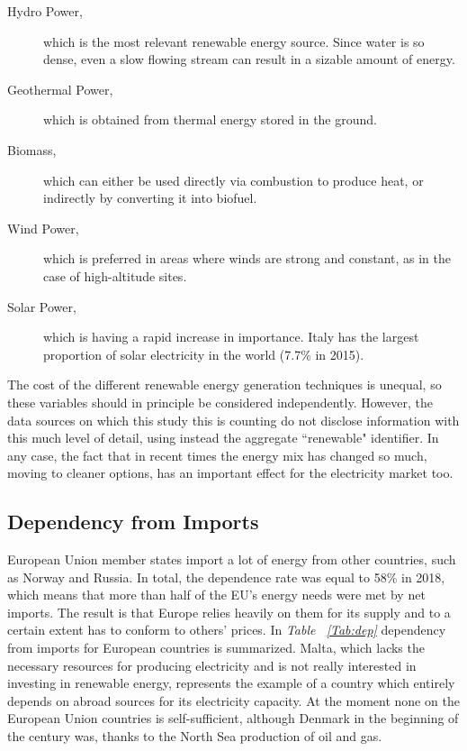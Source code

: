 \documentclass[a4paper,12pt]{book}
\begin{document}
\begin{description}
\item[Hydro Power,] which is the most relevant renewable energy source. Since water is so dense, even a slow flowing stream can result in a sizable amount of energy.
\item [Geothermal Power,] which is obtained from thermal energy stored in the ground.
\item [Biomass,] which can either be used directly via combustion to produce heat, or indirectly by converting it into biofuel.
\item [Wind Power,] which is preferred in areas where winds are strong and constant, as in the case of high-altitude sites.
\item [Solar Power,] which is having a rapid increase in importance. Italy has the largest proportion of solar electricity in the world (7.7\% in 2015).
\end{description}

The cost of the different renewable energy generation techniques is unequal, so these variables should in principle be considered independently. However, the data sources on which this study this is counting do not disclose information with this much level of detail, using instead the aggregate ``renewable" identifier. In any case, the fact that in recent times the energy mix has changed so much, moving to cleaner options, has an important effect for the electricity market too.

\subsection{Dependency from Imports}

European Union member states import a lot of energy from other countries, such as Norway and Russia. In total, the dependence rate was equal to 58\% in 2018, which means that more than half of the EU’s energy needs were met by net imports. The result is that Europe relies heavily on them for its supply and to a certain extent has to conform to others' prices. In \textit{Table ~\ref{Tab:dep}} dependency from imports for European countries is summarized. Malta, which lacks the necessary resources for producing electricity and is not really interested in investing in renewable energy, represents the example of a country which entirely depends on abroad sources for its electricity capacity. At the moment none on the European Union countries is self-sufficient, although Denmark in the beginning of the century was, thanks to the North Sea production of oil and gas.
\end{document}
